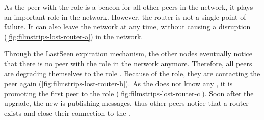 As the peer with the role \router is a beacon for all other peers in the network, it plays an important role in the network. However, the router is not a single point of failure. It can also leave the network at any time, without causing a disruption (\vref{fig:filmstrips-lost-router-a}) in the network.

Through the LastSeen expiration mechanism, the other nodes eventually notice that there is no peer with the role \router in the network anymore. Therefore, all peers are degrading themselves to the role \newbie. Because of the \newbie role, they are contacting the \signal peer again (\vref{fig:filmstrips-lost-router-b}). As the \signal does not know any \router, it is promoting the first peer to the role \router (\vref{fig:filmstrips-lost-router-c}). Soon after the upgrade, the new \router is publishing \routerAlive messages, thus other peers notice that a router exists and close their connection to the \signal.
